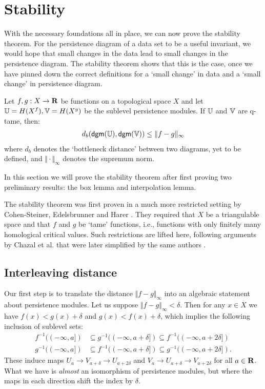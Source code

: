 \section{Stability}
\label{section-stability}

With the necessary foundations all in place, we can now prove the stability theorem. For the persistence diagram of a data set to be a useful invariant, we would hope that small changes in the data lead to small changes in the persistence diagram. The stability theorem shows that this is the case, once we have pinned down the correct definitions for a `small change' in data and a `small change' in persistence diagram.

\begin{theorem}[Stability]
Let $f, g : X \to \mathbf{R}$ be functions on a topological space $X$ and let $\mathbb{U} = H(X^f), \mathbb{V} = H(X^g)$ be the sublevel persistence modules. If $\mathbb{U}$ and $\mathbb{V}$ are q-tame, then:
\begin{align*}
d_b(\mathsf{dgm}(\mathbb{U}), \mathsf{dgm}(\mathbb{V})) \leq \Vert f - g \Vert_\infty
\end{align*}
where $d_b$ denotes the `bottleneck distance' between two diagrams, yet to be defined, and $\Vert \cdot \Vert_\infty$ denotes the supremum norm.
\end{theorem}

In this section we will prove the stability theorem after first proving two preliminary results: the box lemma and interpolation lemma.

The stability theorem was first proven in a much more restricted setting by Cohen-Steiner, Edelsbrunner and Harer \cite{cohen2007stability}. They required that $X$ be a triangulable space and that $f$ and $g$ be `tame' functions, i.e., functions with only finitely many homological critical values. Such restrictions are lifted here, following arguments by Chazal et al. \cite{chazal2009proximity} that were later simplified by the same authors \cite{chazal2012structure}.

\subsection{Interleaving distance}

Our first step is to translate the distance $\Vert f - g \Vert_\infty$ into an algebraic statement about persistence modules. Let us suppose $\Vert f - g \Vert_\infty < \delta$. Then for any $x \in X$ we have $f(x) < g(x) + \delta$ and $g(x) < f(x) + \delta$, which implies the following inclusion of sublevel sets:
\begin{align*}
f^{-1}((-\infty, a]) &\subseteq g^{-1}((-\infty, a+\delta]) \subseteq f^{-1}((-\infty, a+2\delta])\\
g^{-1}((-\infty, a]) &\subseteq f^{-1}((-\infty, a+\delta]) \subseteq g^{-1}((-\infty, a+2\delta]).
\end{align*}
These induce maps $U_a \to V_{a+\delta} \to U_{a + 2\delta}$ and $V_a \to U_{a+\delta} \to V_{a + 2\delta}$ for all $a \in \mathbf{R}$. What we have is \emph{almost} an isomorphism of persistence modules, but where the maps in each direction shift the index by $\delta$.

